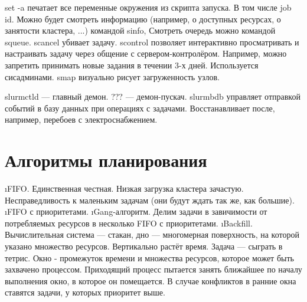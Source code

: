  set -a печатает все переменные окружения из скрипта запуска. В том числе job id. Можно будет смотреть информацию (например, о доступных ресурсах, о занятости кластера, ...) командой sinfo, 
 Смотреть очередь можно командой squeue.
 scancel убивает задачу.
 scontrol позволяет интерактивно просматривать и настраивать задачу через общение с сервером-контролёром. Например, можно запретить принимать новые задания в течении 3-х дней. Используется сисадминами.
 smap визуально рисует загруженность узлов.
 
 slurmctld --- главный демон.
 ??? --- демон-пускач.
 slurmbdb управляет отправкой событий в базу данных при операциях с задачами. Восстанавливает после, например, перебоев с электроснабжением.
 
 \section{Алгоритмы планирования}
 \begin{enumerate}
 \i FIFO. Единственная честная. Низкая загрузка кластера зачастую. Несправедливость к маленьким задачам (они будут ждать так же, как большие).
 \i FIFO с приоритетами.
 \i Gang-алгоритм. Делим задачи в завичимости от потребляемых ресурсов в несколько FIFO с приоритетами.
 \i Backfill. Вычислительная система --- стакан, дно --- многомерная поверхность, на которой указано множество ресурсов. Вертикально растёт время. Задача --- сыграть в тетрис.
  Окно - промежуток времени и множества ресурсов, которое может быть захвачено процессом. Приходящий процесс пытается занять ближайшее по началу выполнения окно, в которое он помещается. В случае конфликтов в ранние окна ставятся задачи, у которых приоритет выше.
 \end{enumerate}


